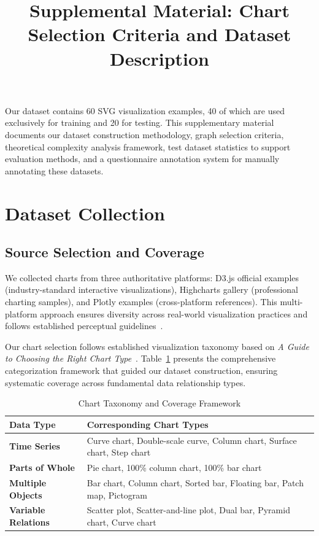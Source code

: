 \documentclass[journal]{IEEEtran}
\title{Supplemental Material: Chart Selection Criteria and Dataset Description}
\begin{document}

Our dataset contains 60 SVG visualization examples, 40 of which are used exclusively for training and 20 for testing. This supplementary material documents our dataset construction methodology, graph selection criteria, theoretical complexity analysis framework, test dataset statistics to support evaluation methods, and a questionnaire annotation system for manually annotating these datasets.

\section{Dataset Collection}

\subsection{Source Selection and Coverage}

We collected charts from three authoritative platforms: D3.js official examples (industry-standard interactive visualizations), Highcharts gallery (professional charting samples), and Plotly examples (cross-platform references). This multi-platform approach ensures diversity across real-world visualization practices and follows established perceptual guidelines~\cite{cleveland1984}.

Our chart selection follows established visualization taxonomy based on \textit{A Guide to Choosing the Right Chart Type}~\cite{szoka1982}. Table~\ref{tab:chart_taxonomy} presents the comprehensive categorization framework that guided our dataset construction, ensuring systematic coverage across fundamental data relationship types.

\begin{table}[!htb]
\centering
\caption{Chart Taxonomy and Coverage Framework}
\label{tab:chart_taxonomy}
\footnotesize
\begin{tabular}{p{2.5cm}p{5.2cm}}
\toprule
\textbf{Data Type} & \textbf{Corresponding Chart Types} \\
\midrule
\textbf{Time Series} & Curve chart, Double-scale curve, Column chart, Surface chart, Step chart \\
\midrule
\textbf{Parts of Whole} & Pie chart, 100\% column chart, 100\% bar chart \\
\midrule
\textbf{Multiple Objects} & Bar chart, Column chart, Sorted bar, Floating bar, Patch map, Pictogram \\
\midrule
\textbf{Variable Relations} & Scatter plot, Scatter-and-line plot, Dual bar, Pyramid chart, Curve chart \\
\bottomrule
\end{tabular}
\end{table}
\end{document}
